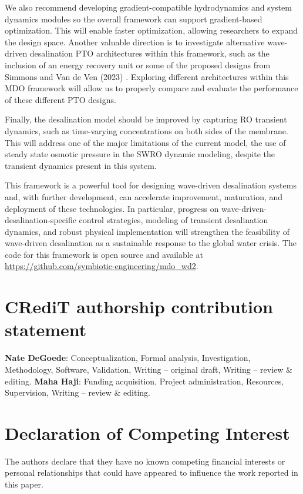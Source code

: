 \documentclass[a4paper,12pt]{elsarticle}
\begin{document}
We also recommend developing gradient-compatible hydrodynamics and system dynamics modules so the overall framework can support gradient-based optimization. This will enable faster optimization, allowing researchers to expand the design space. Another valuable direction is to investigate alternative wave-driven desalination PTO architectures within this framework, such as the inclusion of an energy recovery unit or some of the proposed designs from Simmons and Van de Ven (2023) \cite{Simmons2023}. Exploring different architectures within this MDO framework will allow us to properly compare and evaluate the performance of these different PTO designs.

Finally, the desalination model should be improved by capturing RO transient dynamics, such as time-varying concentrations on both sides of the membrane. This will address one of the major limitations of the current model, the use of steady state osmotic pressure in the SWRO dynamic modeling, despite the transient dynamics present in this system.

This framework is a powerful tool for designing wave-driven desalination systems and, with further development, can accelerate improvement, maturation, and deployment of these technologies. In particular, progress on wave-driven-desalination-specific control strategies, modeling of transient desalination dynamics, and robust physical implementation will strengthen the feasibility of wave-driven desalination as a sustainable response to the global water crisis. The code for this framework is open source and available at \url{https://github.com/symbiotic-engineering/mdo_wd2}.

\section*{CRediT authorship contribution statement}
\textbf{Nate DeGoede}: Conceptualization, Formal analysis, Investigation, Methodology, Software, Validation, Writing – original draft, Writing – review \& editing. \textbf{Maha Haji}: Funding acquisition, Project administration, Resources, Supervision, Writing – review \& editing.

\section*{Declaration of Competing Interest}
The authors declare that they have no known competing financial interests or personal relationships that could have appeared to influence the work reported in this paper.
\end{document}
